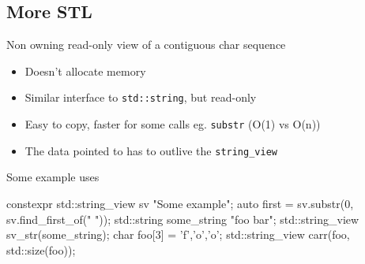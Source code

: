 \subsection{More STL}

\begin{frame}[fragile]
  \begin{block}{Non owning read-only view of a contiguous char sequence}
    \begin{itemize}
    \item Doesn't allocate memory
    \item Similar interface to \texttt{std::string}, but read-only
    \item Easy to copy, faster for some calls eg. \texttt{substr} (O(1) vs O(n))
    \item The data pointed to has to outlive the \texttt{string_view}
    \end{itemize}
  \end{block}
  \begin{exampleblock}{Some example uses}
    \begin{cppcode*}{}
      constexpr std::string_view sv {"Some example"};
      auto first = sv.substr(0, sv.find_first_of(" "));
      std::string some_string {"foo bar"};
      std::string_view sv_str(some_string);
      char foo[3] = {'f','o','o'};
      std::string_view carr(foo, std::size(foo));
    \end{cppcode*}
  \end{exampleblock}
\end{frame}


